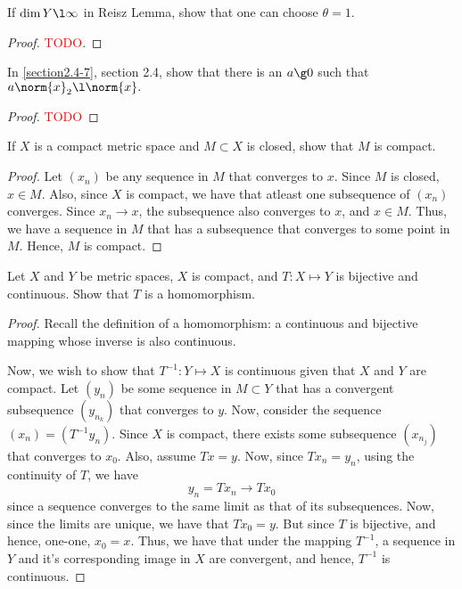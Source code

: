 \begin{question}
    If $\dim Y \l \infty$ in Reisz Lemma, show that one can choose $\theta = 1$.
    \label{section2.5-7}
\end{question}
\begin{proof}
    \textcolor{red}{TODO}.
\end{proof}

\begin{question}
    In \ref{section2.4-7}, section 2.4, show that there is an $a \g 0$ such that $a \norm{x}_2 \l \norm{x}.$
    \label{section2.5-8}
\end{question}
\begin{proof}
    \textcolor{red}{TODO}
\end{proof}

\begin{question}
    If $X$ is a compact metric space and $M \subset X$ is closed, show that $M$ is compact.
    \label{section2.5-9}
\end{question}
\begin{proof}
    Let $(x_n)$ be any sequence in $M$ that converges to $x$. Since $M$ is closed, $x \in M$. Also, since $X$ is compact, we have that atleast one subsequence of $(x_n)$ converges. Since $x_n \rightarrow x$, the subsequence also converges to $x$, and $x \in M$. Thus, we have a sequence in $M$ that has a subsequence that converges to some point in $M$. Hence, $M$ is compact.
\end{proof}

\begin{question}
    Let $X$ and $Y$ be metric spaces, $X$ is compact, and $T : X \mapsto Y$ is bijective and continuous. Show that $T$ is a homomorphism.
    \label{section2.5-10}
\end{question}
\begin{proof}
    Recall the definition of a homomorphism: a continuous and bijective mapping whose inverse is also continuous.

    Now, we wish to show that $T^{-1} : Y \mapsto X$ is continuous given that $X$ and $Y$ are compact. Let $(y_n)$ be some sequence in $M \subset Y$ that has a convergent subsequence $(y_{n_k})$ that converges to $y$. Now, consider the sequence $(x_n) = (T^{-1}y_n)$. Since $X$ is compact, there exists some subsequence $(x_{n_j})$ that converges to $x_0$. Also, assume $Tx = y$.
    Now, since $Tx_n = y_n$, using the continuity of $T$, we have
    \[y_n = Tx_n \rightarrow Tx_0 \]
    since a sequence converges to the same limit as that of its subsequences. Now, since the limits are unique, we have that $Tx_0 = y$. But since $T$ is bijective, and hence, one-one, $x_0 = x$. Thus, we have that under the mapping $T^{-1}$, a sequence in $Y$ and it's corresponding image in $X$ are convergent, and hence, $T^{-1}$ is continuous.
\end{proof}